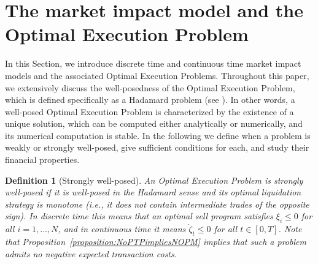\documentclass[final,3p,authoryear,12pt]{elsarticle}
\newtheorem{definition}{Definition}
\begin{document}


\section{The market impact model and the Optimal Execution Problem}\label{sec:problem}

In this Section, we introduce discrete time and continuous time market impact models and the associated Optimal Execution Problems. 
Throughout this paper, we extensively discuss the well-posedness of the Optimal Execution Problem, which is defined specifically as a Hadamard problem (see \cite{hadamard1902problemes}). In other words, a well-posed Optimal Execution Problem is characterized by the existence of a unique solution, which can be computed either analytically or numerically, and its numerical computation is stable. In the following we define when a problem is weakly or strongly well-posed, give sufficient conditions for each, and study their financial properties. 

\begin{definition}[Strongly well-posed]
\label{definition:strongly_well_posed}
An Optimal Execution Problem is \emph{strongly well-posed} if it is well-posed
in the Hadamard sense and its optimal liquidation strategy is monotone (i.e.,
it does not contain intermediate trades of the opposite sign). In discrete time
this means that an optimal sell program satisfies $\xi_i\le 0$ for all
$i=1,\dots,N$, and in continuous time it means $\dot\zeta_t\le 0$ for all
$t\in[0,T]$.
Note that Proposition~\ref{proposition:NoPTPimpliesNOPM} implies that such a
problem admits no negative expected transaction costs.
\end{definition}
\end{document}
